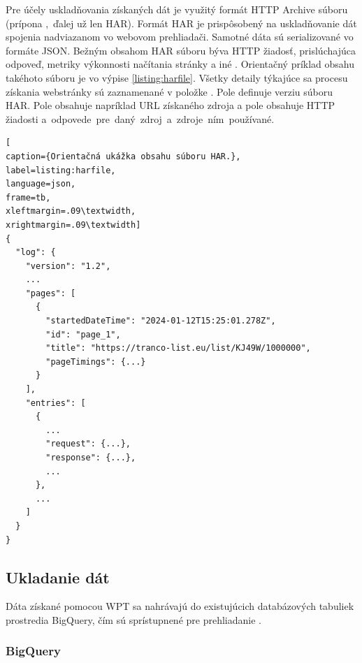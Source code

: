 Pre účely uskladňovania získaných dát je využitý formát HTTP Archive súboru (prípona \mbox{, ďalej} už len HAR).
Formát HAR je prispôsobený na uskladňovanie dát spojenia nadviazanom vo webovom prehliadači. 
Samotné dáta sú serializované vo formáte JSON.
Bežným obsahom HAR súboru býva HTTP žiadosť, prislúchajúca odpoveď, metriky výkonnosti načítania stránky a iné \cite{httparchive-harfile}. 
Orientačný príklad obsahu takéhoto súboru je vo výpise \ref{listing:harfile}.
Všetky detaily týkajúce sa procesu získania webstránky sú zaznamenané v položke . 
Pole  definuje verziu súboru HAR. Pole  obsahuje napríklad URL získaného zdroja a pole  obsahuje HTTP žiadosti \mbox{a odpovede pre daný zdroj a zdroje ním používané.}

\begin{center}
\centering
\begin{lstlisting}[
caption={Orientačná ukážka obsahu súboru HAR.},
label=listing:harfile, 
language=json, 
frame=tb,
xleftmargin=.09\textwidth, 
xrightmargin=.09\textwidth]
{
  "log": {
    "version": "1.2",
    ...
    "pages": [
      {
        "startedDateTime": "2024-01-12T15:25:01.278Z",
        "id": "page_1",
        "title": "https://tranco-list.eu/list/KJ49W/1000000",
        "pageTimings": {...}
      }
    ],
    "entries": [
      {
        ...
        "request": {...},
        "response": {...},
        ...
      },
      ...
    ]
  }
}
\end{lstlisting}
\end{center} 

\subsection{Ukladanie dát}
\label{httparchive-data-storage}

Dáta získané pomocou WPT sa nahrávajú do existujúcich databázových tabuliek prostredia BigQuery, čím sú sprístupnené pre prehliadanie \cite{httparchive-faq}.

\subsubsection{BigQuery}
\label{big-query}

